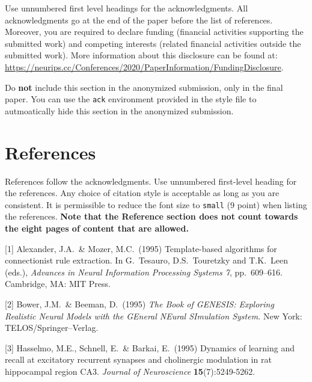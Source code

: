 \documentclass{article}
\theoremstyle{definition}
\begin{document}
\begin{ack}
Use unnumbered first level headings for the acknowledgments. All acknowledgments
go at the end of the paper before the list of references. Moreover, you are required to declare 
funding (financial activities supporting the submitted work) and competing interests (related financial activities outside the submitted work). 
More information about this disclosure can be found at: \url{https://neurips.cc/Conferences/2020/PaperInformation/FundingDisclosure}.


Do {\bf not} include this section in the anonymized submission, only in the final paper. You can use the \texttt{ack} environment provided in the style file to autmoatically hide this section in the anonymized submission.
\end{ack}

\section*{References}

References follow the acknowledgments. Use unnumbered first-level heading for
the references. Any choice of citation style is acceptable as long as you are
consistent. It is permissible to reduce the font size to \verb+small+ (9 point)
when listing the references.
{\bf Note that the Reference section does not count towards the eight pages of content that are allowed.}
\medskip

\small

[1] Alexander, J.A.\ \& Mozer, M.C.\ (1995) Template-based algorithms for
connectionist rule extraction. In G.\ Tesauro, D.S.\ Touretzky and T.K.\ Leen
(eds.), {\it Advances in Neural Information Processing Systems 7},
pp.\ 609--616. Cambridge, MA: MIT Press.

[2] Bower, J.M.\ \& Beeman, D.\ (1995) {\it The Book of GENESIS: Exploring
  Realistic Neural Models with the GEneral NEural SImulation System.}  New York:
TELOS/Springer--Verlag.

[3] Hasselmo, M.E., Schnell, E.\ \& Barkai, E.\ (1995) Dynamics of learning and
recall at excitatory recurrent synapses and cholinergic modulation in rat
hippocampal region CA3. {\it Journal of Neuroscience} {\bf 15}(7):5249-5262.
\end{document}
